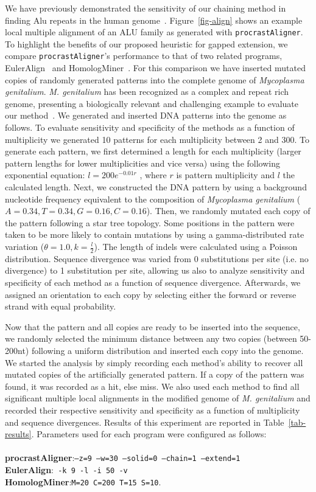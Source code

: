 \documentclass{ws-procs975x65}
\begin{document}
We have previously demonstrated the sensitivity of our chaining method in finding Alu repeats in
the human genome~\cite{ref-procrast}. Figure~\ref{fig-align} shows an example local multiple alignment of an ALU family as generated with \texttt{procrastAligner}. To highlight the benefits of our proposed heuristic for gapped extension, we compare \texttt{procrastAligner}'s performance to that of two related programs, EulerAlign~\cite{ref-related1} and HomologMiner~\cite{ref-homologminer}. For this comparison we have inserted mutated copies of randomly generated patterns into the complete genome of \emph{Mycoplasma genitalium}. \emph{M. genitalium} has been recognized as a complex and repeat rich genome, presenting a biologically relevant and challenging example to evaluate our method~\cite{ref-mycoplasma}. We generated and inserted DNA patterns into the genome as follows. To evaluate sensitivity and specificity of the methods as a function of multiplicity we generated 10 patterns for each multiplicity between 2 and 300. To generate each pattern, we first determined a length for each multiplicity (larger pattern lengths for lower multiplicities and vice versa) using the following exponential equation: $l = 200e^{-0.01r}$ , where $r$ is pattern multiplicity and $l$ the calculated length. Next, we constructed the DNA pattern by using a background nucleotide frequency equivalent to the composition of \emph{Mycoplasma genitalium} ($A=0.34,T=0.34,G=0.16,C=0.16$). Then, we randomly mutated each copy of the pattern following a star tree topology. Some positions in the pattern were taken to be more likely to contain mutations by using a gamma-distributed rate variation ($\theta = 1.0, k = \frac{l}{2}$). The length of indels were calculated using a Poisson distribution. Sequence divergence was varied from 0 substitutions per site (i.e. no divergence) to 1 substitution per site, allowing us also to analyze sensitivity and specificity of each method as a function of sequence divergence. Afterwards, we assigned an orientation to each copy by selecting either the forward or reverse strand with equal probability.

Now that the pattern and all copies are ready to be inserted into the sequence, we randomly selected the minimum distance between any two copies (between 50-200nt) following a uniform distribution and inserted each copy into the genome.  We started the analysis by simply recording each method's ability to recover all mutated copies of the  artificially generated pattern. If a copy of the pattern was found, it was recorded as a hit, else miss. We also used each method to find all significant multiple local alignments in the modified genome of \emph{M. genitalium} and recorded their respective sensitivity and specificity as a function of multiplicity and sequence divergences. Results of this experiment are reported in Table~\ref{tab-results}. Parameters used for each program were configured as follows: \\ \\ \textbf{procrastAligner}:\texttt{--z=9 --w=30 --solid=0 --chain=1 --extend=1}\\ \textbf{EulerAlign}:\texttt{ -k 9 -l -i 50 -v} \\ \textbf{HomologMiner}:\texttt{M=20 C=200 T=15 S=10}.
\end{document}

